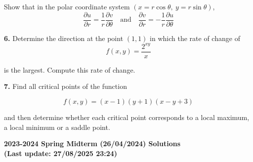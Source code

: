\documentclass{article}
\begin{document}
Show that in the polar coordinate system $(x=r\cos\theta,\:y=r\sin\theta)$,
\[\frac{\partial u}{\partial r}=\frac1r\frac{\partial v}{\partial\theta}\quad\text{and}\quad\frac{\partial v}{\partial r}=-\frac1r\frac{\partial u}{\partial \theta}\]

\vspace{1em}

\textbf{6.} Determine the direction at the point $(1,1)$ in which the rate of change of
\[f(x,y)=\frac{2^{xy}}x\]

is the largest. Compute this rate of change.

\vspace{1em}

\textbf{7.} Find all critical points of the function

\[f(x,y)=(x-1)(y+1)(x-y+3)\]

and then determine whether each critical point corresponds to a local maximum, a local minimum or a saddle point.

\newpage

\begin{center}
\textbf{2023-2024 Spring Midterm (26/04/2024) Solutions\\
(Last update: 27/08/2025 23:24)}
\end{center}
\end{document}
